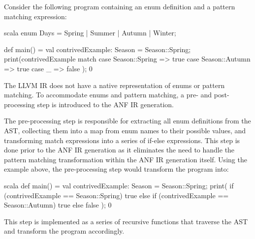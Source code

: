 
Consider the following program containing an enum definition and a pattern matching expression:

\begin{code}{scala}
    enum Days = Spring | Summer | Autumn | Winter;

    def main() = {
        val contrivedExample: Season = Season::Spring;
        print(contrivedExample match {
            case Season::Spring => true
            case Season::Autumn => true
            case _ => false
        });
        0
    }
\end{code}

The LLVM IR does not have a native representation of enums or pattern matching. To accommodate enums
and pattern matching, a pre- and post-processing step is introduced to the ANF IR generation.

The pre-processing step is responsible for extracting all enum definitions from the AST, collecting
them into a map from enum names to their possible values, and transforming match expressions into a
series of if-else expressions. This step is done prior to the ANF IR generation as it eliminates the
need to handle the pattern matching transformation within the ANF IR generation itself. Using the
example above, the pre-processing step would transform the program into:

\begin{code}{scala}
    def main() = {
        val contrivedExample: Season = Season::Spring;
        print(
            if (contrivedExample == Season::Spring) {
                true
            } else if (contrivedExample == Season::Autumn) {
                true
            } else {
                false
            }
        );
        0
    }
\end{code}

This step is implemented as a series of recursive functions that traverse the AST and transform the
program accordingly.

